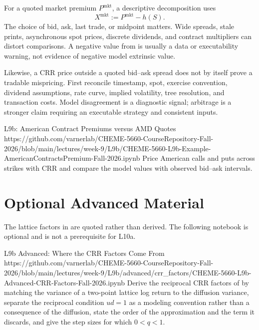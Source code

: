 \documentclass[11pt]{article}
\begin{document}
For a quoted market premium $P^{\mathrm{mkt}}$, a descriptive decomposition uses
\begin{equation}
  \label{eq:market-decomposition}
  X^{\mathrm{mkt}}:=P^{\mathrm{mkt}}-h(S).
\end{equation}
The choice of bid, ask, last trade, or midpoint matters. Wide spreads, stale prints, asynchronous spot prices, discrete dividends, and contract multipliers can distort comparisons. A negative value from  is usually a data or executability warning, not evidence of negative model extrinsic value.

Likewise, a CRR price outside a quoted bid--ask spread does not by itself prove a tradable mispricing. First reconcile timestamp, spot, exercise convention, dividend assumptions, rate curve, implied volatility, tree resolution, and transaction costs. Model disagreement is a diagnostic signal; arbitrage is a stronger claim requiring an executable strategy and consistent inputs.

\notebooklink
  {L9b: American Contract Premiums versus AMD Quotes}
  {https://github.com/varnerlab/CHEME-5660-CourseRepository-Fall-2026/blob/main/lectures/week-9/L9b/CHEME-5660-L9b-Example-AmericanContractsPremium-Fall-2026.ipynb}
  {Price American calls and puts across strikes with CRR and compare the model values with observed bid--ask intervals.}

\section*{Optional Advanced Material}

The lattice factors in  are quoted rather than derived. The following notebook is optional and is not a prerequisite for L10a.

\notebooklink
  {L9b Advanced: Where the CRR Factors Come From}
  {https://github.com/varnerlab/CHEME-5660-CourseRepository-Fall-2026/blob/main/lectures/week-9/L9b/advanced/crr_factors/CHEME-5660-L9b-Advanced-CRR-Factors-Fall-2026.ipynb}
  {Derive the reciprocal CRR factors of  by matching the variance of a two-point lattice log return to the diffusion variance, separate the reciprocal condition $ud=1$ as a modeling convention rather than a consequence of the diffusion, state the order of the approximation and the term it discards, and give the step sizes for which $0<q<1$.}
\end{document}
